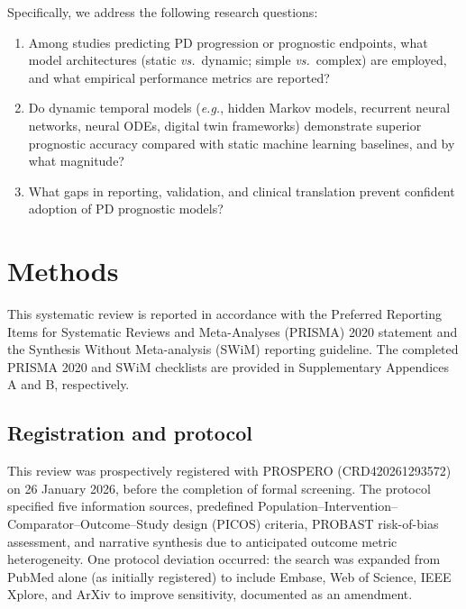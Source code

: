 \documentclass[11pt,a4paper]{article}
\newcommand{\eg}{\textit{e.g.}}
\begin{document}
\noindent Specifically, we address the following research questions:

\begin{enumerate}[leftmargin=*]
    \item Among studies predicting PD progression or prognostic endpoints, what model architectures (static \textit{vs.}\ dynamic; simple \textit{vs.}\ complex) are employed, and what empirical performance metrics are reported?
    \item Do dynamic temporal models (\eg, hidden Markov models, recurrent neural networks, neural ODEs, digital twin frameworks) demonstrate superior prognostic accuracy compared with static machine learning baselines, and by what magnitude?
    \item What gaps in reporting, validation, and clinical translation prevent confident adoption of PD prognostic models?
\end{enumerate}

\section{Methods}

This systematic review is reported in accordance with the Preferred Reporting Items for Systematic Reviews and Meta-Analyses (PRISMA) 2020 statement\cite{page2021} and the Synthesis Without Meta-analysis (SWiM) reporting guideline\cite{campbell2020}. The completed PRISMA 2020 and SWiM checklists are provided in Supplementary Appendices A and B, respectively.

\subsection{Registration and protocol}

This review was prospectively registered with PROSPERO (CRD420261293572) on 26 January 2026, before the completion of formal screening. The protocol specified five information sources, predefined Population--Intervention--Comparator--Outcome--Study design (PICOS) criteria, PROBAST risk-of-bias assessment, and narrative synthesis due to anticipated outcome metric heterogeneity. One protocol deviation occurred: the search was expanded from PubMed alone (as initially registered) to include Embase, Web of Science, IEEE Xplore, and ArXiv to improve sensitivity, documented as an amendment.
\end{document}
